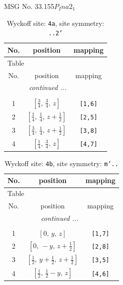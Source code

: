 \documentclass[fleqn,8pt]{jsarticle}
\begin{document}
\setcounter{MaxMatrixCols}{32}

\renewcommand{\tablename}{Table~}
\renewcommand{\figurename}{Figure~}
\begin{center}
\LARGE
MSG No. 33.155\quad$P_{I}na2_{1}$
\end{center}
\renewcommand{\arraystretch}{1.2}
\begin{longtable}{ccc}
\caption{Wyckoff site: {\tt 4a}, site symmetry: {\tt ..2'}}
 \\
 \hline \hline
No. & position & mapping \\ \hline \endfirsthead

\multicolumn{2}{l}{\tablename\ \thetable{}} \\
 \hline \hline
No. & position & mapping \\ \hline \endhead

 \hline \hline
\multicolumn{2}{r}{\footnotesize\it continued ...} \\ \endfoot

 \hline \hline
\multicolumn{2}{r}{} \\ \endlastfoot

1 & $\left[ \frac{3}{4},\, \frac{3}{4},\, z \right]$ & {\tt [1,6]} \\ \hline
2 & $\left[ \frac{1}{4},\, \frac{1}{4},\, z + \frac{1}{2} \right]$ & {\tt [2,5]} \\ \hline
3 & $\left[ \frac{3}{4},\, \frac{1}{4},\, z + \frac{1}{2} \right]$ & {\tt [3,8]} \\ \hline
4 & $\left[ \frac{1}{4},\, \frac{3}{4},\, z \right]$ & {\tt [4,7]} \\
\end{longtable}
\renewcommand{\arraystretch}{1.2}
\begin{longtable}{ccc}
\caption{Wyckoff site: {\tt 4b}, site symmetry: {\tt m'..}}
 \\
 \hline \hline
No. & position & mapping \\ \hline \endfirsthead

\multicolumn{2}{l}{\tablename\ \thetable{}} \\
 \hline \hline
No. & position & mapping \\ \hline \endhead

 \hline \hline
\multicolumn{2}{r}{\footnotesize\it continued ...} \\ \endfoot

 \hline \hline
\multicolumn{2}{r}{} \\ \endlastfoot

1 & $\left[ 0,\, y,\, z \right]$ & {\tt [1,7]} \\ \hline
2 & $\left[ 0,\, - y,\, z + \frac{1}{2} \right]$ & {\tt [2,8]} \\ \hline
3 & $\left[ \frac{1}{2},\, y + \frac{1}{2},\, z + \frac{1}{2} \right]$ & {\tt [3,5]} \\ \hline
4 & $\left[ \frac{1}{2},\, \frac{1}{2} - y,\, z \right]$ & {\tt [4,6]} \\
\end{longtable}
\end{document}
